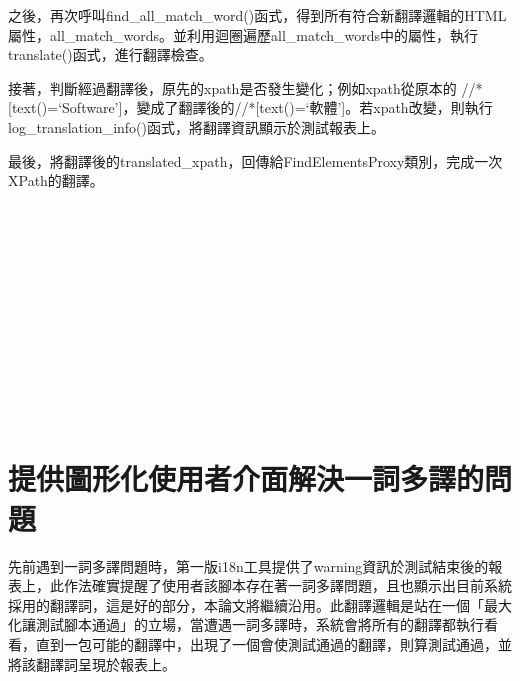 之後，再次呼叫find\_all\_match\_word()函式，得到所有符合新翻譯邏輯的HTML屬性，all\_match\_words。並利用迴圈遍歷all\_match\_words中的屬性，執行translate()函式，進行翻譯檢查。

接著，判斷經過翻譯後，原先的xpath是否發生變化；例如xpath從原本的 //*[text()=‘Software']，變成了翻譯後的//*[text()=‘軟體']。若xpath改變，則執行log\_translation\_info()函式，將翻譯資訊顯示於測試報表上。

最後，將翻譯後的translated\_xpath，回傳給FindElementsProxy類別，完成一次XPath的翻譯。

\hspace*{\fill} \\
\\ \hspace*{\fill} \\
\\ \hspace*{\fill} \\
\\ \hspace*{\fill} \\
\\ \hspace*{\fill} \\
\\ \hspace*{\fill} \\
\section{提供圖形化使用者介面解決一詞多譯的問題}
先前遇到一詞多譯問題時，第一版i18n工具提供了warning資訊於測試結束後的報表上，此作法確實提醒了使用者該腳本存在著一詞多譯問題，且也顯示出目前系統採用的翻譯詞，這是好的部分，本論文將繼續沿用。此翻譯邏輯是站在一個「最大化讓測試腳本通過」的立場，當遭遇一詞多譯時，系統會將所有的翻譯都執行看看，直到一包可能的翻譯中，出現了一個會使測試通過的翻譯，則算測試通過，並將該翻譯詞呈現於報表上。


